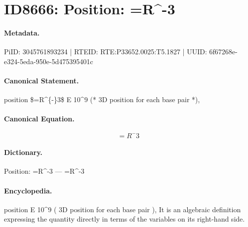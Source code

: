 \section*{ID8666: Position: =R\textasciicircum{}-3}
\paragraph{Metadata.}
PiID: 3045761893234 | RTEID: RTE:P33652.0025:T5.1827 | UUID: 6f67268e-e324-5eda-950e-5d475395401c

\paragraph{Canonical Statement.}
position \$=R\textasciicircum{}\{-\}3\$ E 10\textasciicircum{}9 (* 3D position for each base pair *),

\paragraph{Canonical Equation.}
\[
=R^{-}3
\]

\paragraph{Dictionary.}
Position: =R\textasciicircum{}-3 — =R\textasciicircum{}-3

\paragraph{Encyclopedia.}
position E 10\textasciicircum{}9 ( 3D position for each base pair ), It is an algebraic definition expressing the quantity directly in terms of the variables on its right-hand side.

